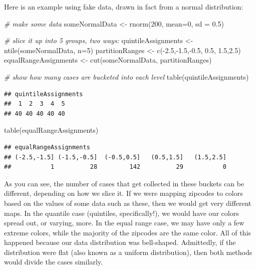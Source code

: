 \documentclass[
  openany]{book}
\newenvironment{Shaded}{\begin{snugshade}}{\end{snugshade}}
\newcommand{\AttributeTok}[1]{\textcolor[rgb]{0.77,0.63,0.00}{#1}}
\newcommand{\CommentTok}[1]{\textcolor[rgb]{0.56,0.35,0.01}{\textit{#1}}}
\newcommand{\DecValTok}[1]{\textcolor[rgb]{0.00,0.00,0.81}{#1}}
\newcommand{\FloatTok}[1]{\textcolor[rgb]{0.00,0.00,0.81}{#1}}
\newcommand{\FunctionTok}[1]{\textcolor[rgb]{0.00,0.00,0.00}{#1}}
\newcommand{\NormalTok}[1]{#1}
\newcommand{\OtherTok}[1]{\textcolor[rgb]{0.56,0.35,0.01}{#1}}
\newcommand{\SpecialCharTok}[1]{\textcolor[rgb]{0.00,0.00,0.00}{#1}}
\begin{document}
Here is an example using fake data, drawn in fact from a normal distribution:

\begin{Shaded}
\begin{Highlighting}[]
\CommentTok{\# make some data}
\NormalTok{someNormalData }\OtherTok{\textless{}{-}} \FunctionTok{rnorm}\NormalTok{(}\DecValTok{200}\NormalTok{, }\AttributeTok{mean=}\DecValTok{0}\NormalTok{, }\AttributeTok{sd =} \FloatTok{0.5}\NormalTok{)}

\CommentTok{\# slice it up into 5 groups, two ways:}
\NormalTok{quintileAssignments }\OtherTok{\textless{}{-}} \FunctionTok{ntile}\NormalTok{(someNormalData, }\AttributeTok{n=}\DecValTok{5}\NormalTok{)}
\NormalTok{partitionRanges }\OtherTok{\textless{}{-}} \FunctionTok{c}\NormalTok{(}\SpecialCharTok{{-}}\FloatTok{2.5}\NormalTok{,}\SpecialCharTok{{-}}\FloatTok{1.5}\NormalTok{,}\SpecialCharTok{{-}}\FloatTok{0.5}\NormalTok{, }\FloatTok{0.5}\NormalTok{, }\FloatTok{1.5}\NormalTok{,}\FloatTok{2.5}\NormalTok{)}
\NormalTok{equalRangeAssignments }\OtherTok{\textless{}{-}} \FunctionTok{cut}\NormalTok{(someNormalData, partitionRanges)}

\CommentTok{\# show how many cases are bucketed into each level}
\FunctionTok{table}\NormalTok{(quintileAssignments)}
\end{Highlighting}
\end{Shaded}

\begin{verbatim}
## quintileAssignments
##  1  2  3  4  5 
## 40 40 40 40 40
\end{verbatim}

\begin{Shaded}
\begin{Highlighting}[]
\FunctionTok{table}\NormalTok{(equalRangeAssignments)}
\end{Highlighting}
\end{Shaded}

\begin{verbatim}
## equalRangeAssignments
## (-2.5,-1.5] (-1.5,-0.5]  (-0.5,0.5]   (0.5,1.5]   (1.5,2.5] 
##           1          28         142          29           0
\end{verbatim}

As you can see, the number of cases that get collected in these buckets can be different, depending on how we slice it. If we were mapping zipcodes to colors based on the values of some data such as these, then we would get very different maps. In the quantile case (quintiles, specifically!), we would have our colors spread out, or varying, more. In the equal range case, we may have only a few extreme colors, while the majority of the zipcodes are the same color. All of this happened because our data distribution was bell-shaped. Admittedly, if the distribution were flat (also known as a uniform distribution), then both methods would divide the cases similarly.
\end{document}
